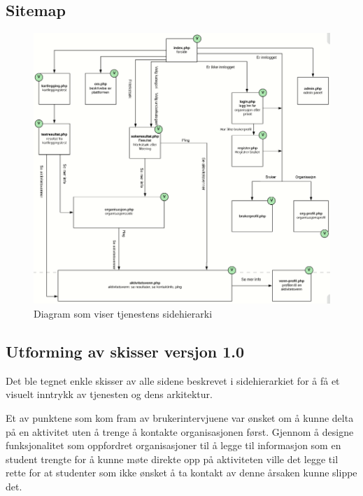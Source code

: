 \subsection{Sitemap}

\begin{figure}[H]
\includegraphics[width=\textwidth]{Illustrasjoner/trehierarki.png}
\caption{Diagram som viser tjenestens sidehierarki}
\label{fig:trehierarki}
\end{figure}



\subsection{Utforming av skisser versjon 1.0}
\label{section:utforming-1}


Det ble tegnet enkle skisser av alle sidene beskrevet i sidehierarkiet for å få et visuelt inntrykk av tjenesten og dens arkitektur.

Et av punktene som kom fram av brukerintervjuene var ønsket om å kunne delta på en aktivitet uten å trenge å kontakte organisasjonen først. Gjennom å designe funksjonalitet som oppfordret organisasjoner til å legge til informasjon som en student trengte for å kunne møte direkte opp på aktiviteten ville det legge til rette for at studenter som ikke ønsket å ta kontakt av denne årsaken kunne slippe det.

